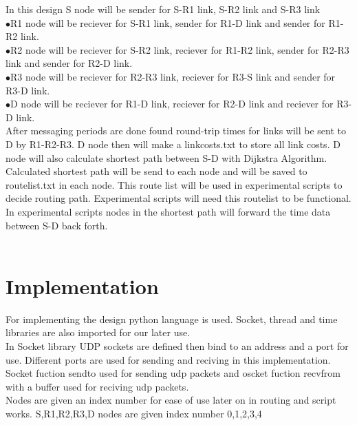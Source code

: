 \documentclass[conference]{IEEEtran}
\begin{document}
In this design S node will be sender for S-R1 link, S-R2 link and S-R3 link \\

$\bullet$R1 node will be reciever for S-R1 link, sender for R1-D link and sender for R1-R2 link.\\

$\bullet$R2 node will be reciever for S-R2 link, reciever for R1-R2 link, sender for R2-R3 link and sender for R2-D link.\\

$\bullet$R3 node will be reciever for R2-R3 link, reciever for R3-S link and sender for R3-D link.\\

$\bullet$D node will be reciever for R1-D link, reciever for R2-D link and reciever for R3-D link.\\

After messaging periods are done found round-trip times for links will be sent to D by R1-R2-R3. D node then will make a linkcosts.txt to store all link costs. D node will also calculate shortest path between S-D with Dijkstra Algorithm. Calculated shortest path will be send to each node and will be saved to routelist.txt in each node. This route list will be used in experimental scripts to decide routing path. Experimental scripts will need this routelist to be functional. In experimental scripts nodes in the shortest path will forward the time data between S-D back forth.\\ \quad \\

\section{Implementation}


For implementing the design python language is used. Socket, thread and time libraries are also imported for our later use.\\

In Socket library UDP sockets are defined then bind to an address and a port for use. Different ports are used for sending and reciving in this implementation. Socket fuction sendto used for sending udp packets and oscket fuction recvfrom with a buffer used for reciving udp packets.\\

Nodes are given an index number for ease of use later on in routing and script works. S,R1,R2,R3,D nodes are given index number 0,1,2,3,4 \\
\end{document}
